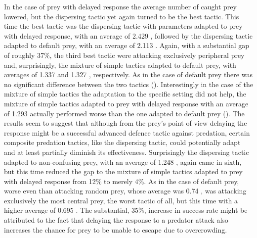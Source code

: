 In the case of prey with delayed response the average number of caught prey lowered, but the dispersing tactic yet again turned to be the best tactic. This time the best tactic was the dispersing tactic with parameters adapted to prey with delayed response, with an average of \num{2.429} , followed by the dispersing tactic adapted to default prey, with an average of \num{2.113} . Again, with a substantial gap of roughly 37\%, the third best tactic were attacking exclusively peripheral prey and, surprisingly, the mixture of simple tactics adapted to default prey, with averages of \num{1.337}  and \num{1.327} , respectively. As in the case of default prey there was no significant difference between the two tactics (). Interestingly in the case of the mixture of simple tactics the adaptation to the specific setting did not help, the mixture of simple tactics adapted to prey with delayed response with an average of \num{1.293}  actually performed worse than the one adapted to default prey (). The results seem to suggest that although from the prey's point of view delaying the response might be a successful advanced defence tactic against predation, certain composite predation tactics, like the dispersing tactic, could potentially adapt and at least partially diminish its effectiveness. Surprisingly the dispersing tactic adapted to non-confusing prey, with an average of \num{1.248} , again came in sixth, but this time reduced the gap to the mixture of simple tactics adapted to prey with delayed response from 12\% to merely 4\%. As in the case of default prey, worse even than attacking random prey, whose average was \num{0.74} , was attacking exclusively the most central prey, the worst tactic of all, but this time with a higher average of \num{0.695} . The substantial, 35\%, increase in success rate might be attributed to the fact that delaying the response to a predator attack also increases the chance for prey to be unable to escape due to overcrowding.

